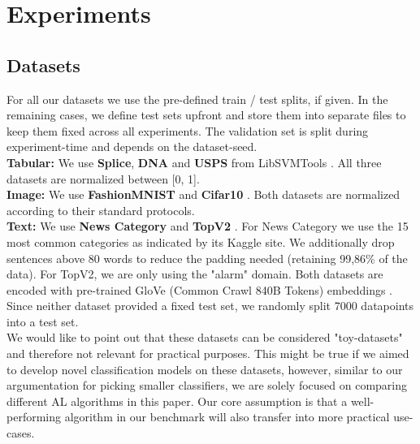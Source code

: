 \documentclass[]{article}
\begin{document}
\section{Experiments}

\subsection{Datasets}\label{sec:datasets}
For all our datasets we use the pre-defined train / test splits, if given. 
In the remaining cases, we define test sets upfront and store them into separate files to keep them fixed across all experiments.
The validation set is split during experiment-time and depends on the dataset-seed.\\
\textbf{Tabular:}
We use \textbf{Splice}, \textbf{DNA} and \textbf{USPS} from LibSVMTools \cite{libsvmtools}.
All three datasets are normalized between [0, 1]. \\
\textbf{Image:}
We use \textbf{FashionMNIST} \cite{xiao2017fashion} and \textbf{Cifar10} \cite{krizhevsky2009learning}.
Both datasets are normalized according to their standard protocols. \\
\textbf{Text:}
We use \textbf{News Category} \cite{misra2022news} and \textbf{TopV2} \cite{chen-etal-2020-low-resource}.
For News Category we use  the 15 most common categories as indicated by its Kaggle site.
We additionally drop sentences above 80 words to reduce the padding needed (retaining 99,86\% of the data).
For TopV2, we are only using the "alarm" domain.
Both datasets are encoded with pre-trained GloVe (Common Crawl 840B Tokens) embeddings \cite{pennington2014glove}.
Since neither dataset provided a fixed test set, we randomly split 7000 datapoints into a test set. \\ [1mm]
%
We would like to point out that these datasets can be considered "toy-datasets" and therefore not relevant for practical purposes.
This might be true if we aimed to develop novel classification models on these datasets, however, similar to our argumentation for picking smaller classifiers, we are solely focused on comparing different AL algorithms in this paper.
Our core assumption is that a well-performing algorithm in our benchmark will also transfer into more practical use-cases. \\ [1mm]
\end{document}
